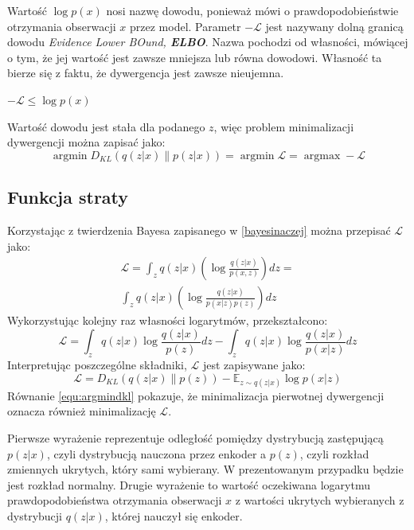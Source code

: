 \documentclass[a4paper,12pt,oneside]{book} %
\begin{document}
Wartość $\log p(x)$ nosi nazwę dowodu, ponieważ mówi o prawdopodobieństwie otrzymania obserwacji $x$ przez model.
Parametr $-\mathcal{L}$ jest nazywany dolną granicą dowodu \textit{Evidence Lower BOund, \textbf{ELBO}}. Nazwa pochodzi od własności, mówiącej o tym, że jej wartość jest zawsze mniejsza lub równa dowodowi. Własność ta bierze się z faktu, że dywergencja jest zawsze nieujemna.
\begin{center}
	$-\mathcal{L}\leq\log p(x)$
\end{center}
Wartość dowodu jest stała dla podanego $z$, więc problem minimalizacji dywergencji można zapisać jako:
\begin{equation}
	\operatorname*{argmin}D_{KL}(q(z|x)\|p(z|x)) = \operatorname*{argmin}\mathcal{L} = \operatorname*{argmax}-\mathcal{L}
	\label{equ:argmindkl}
\end{equation}
\subsection{Funkcja straty}
Korzystając z twierdzenia Bayesa zapisanego w \ref{bayesinaczej} można przepisać $\mathcal{L}$ jako:
\begin{equation}
	\begin{aligned}
		\mathcal{L}=\displaystyle\int_{z}^{}q(z|x)\left( \log\frac{q(z|x)}{p(x,z)}\right)dz=\\[1ex]
		\displaystyle\int_{z}^{}q(z|x)\left( \log\frac{q(z|x)}{p(x|z)p(z)}\right)dz
		\label{equ:kldlogagn}
	\end{aligned}
\end{equation}
Wykorzystując kolejny raz własności logarytmów, przekształcono:
\begin{equation}
	\mathcal{L}=\displaystyle\int_{z}^{}q(z|x)\log\frac{q(z|x)}{p(z)}dz - \displaystyle\int_{z}^{}q(z|x)\log\frac{q(z|x)}{p(x|z)}dz
	\label{equ:elbolog}
\end{equation}
Interpretując poszczególne składniki, $\mathcal{L}$ jest zapisywane jako:
\begin{equation}
	\mathcal{L} =  D_{KL}(q(z|x)\|p(z)) - \mathbb{E}_{z\sim q(z|x)}\log p(x|z)
	\label{equ:ostatniejuz}
\end{equation}
Równanie \ref{equ:argmindkl} pokazuje, że minimalizacja pierwotnej dywergencji oznacza również minimalizację $\mathcal{L}$. 

Pierwsze wyrażenie reprezentuje odległość pomiędzy dystrybucją zastępującą $p(z|x)$, czyli dystrybucją nauczona przez enkoder a $p(z)$, czyli rozkład zmiennych ukrytych, który sami wybierany. W prezentowanym przypadku będzie jest rozkład normalny. Drugie wyrażenie to wartość oczekiwana logarytmu prawdopodobieństwa otrzymania obserwacji $x$ z wartości ukrytych wybieranych z dystrybucji $q(z|x)$, której nauczył się enkoder.
\end{document}
